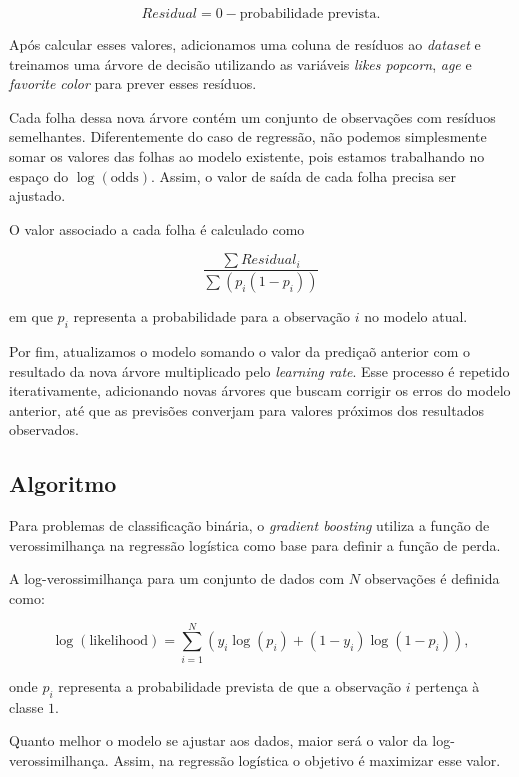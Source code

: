\documentclass{article}
\begin{document}
\begin{equation*}
    Residual = 0 - \text{probabilidade prevista}.
\end{equation*}

Após calcular esses valores, adicionamos uma coluna de resíduos 
ao \textit{dataset} e treinamos uma árvore de decisão utilizando as 
variáveis \textit{likes popcorn}, \textit{age} e \textit{favorite color}
para prever esses resíduos.

Cada folha dessa nova árvore contém um conjunto de observações com 
resíduos semelhantes. Diferentemente do caso de regressão, não podemos
simplesmente somar os valores das folhas ao modelo existente, pois 
estamos trabalhando no espaço do $\log (\text{odds})$. Assim, o valor 
de saída de cada folha precisa ser ajustado. 

O valor associado a cada folha é calculado como

\begin{equation*}
    \frac{\sum Residual_i}{\sum (p_i (1 - p_i))}
\end{equation*}

em que $p_i$ representa a probabilidade para a observação $i$ 
no modelo atual.

Por fim, atualizamos o modelo somando o valor da prediçaõ anterior 
com o resultado da nova árvore multiplicado pelo \textit{learning rate}.
Esse processo é repetido iterativamente, adicionando novas árvores 
que buscam corrigir os erros do modelo anterior, até que as previsões 
converjam para valores próximos dos resultados observados.

\subsection{Algoritmo}

Para problemas de classificação binária, o \textit{gradient boosting}
utiliza a função de verossimilhança na regressão logística como base 
para definir a função de perda.

A log-verossimilhança para um conjunto de dados com $N$ observações 
é definida como:

\begin{equation*}
    \log(\text{likelihood}) = \sum_{i=1}^{N}\left(y_i \log(p_i) + (1-y_i)\log(1-p_i)\right),
\end{equation*}

onde $p_i$ representa a probabilidade prevista de que a observação 
$i$ pertença à classe $1$.

Quanto melhor o modelo se ajustar aos dados, maior será o valor 
da log-verossimilhança. Assim, na regressão logística o objetivo 
é maximizar esse valor. 
\end{document}
